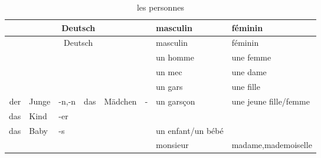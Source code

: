 \documentclass[12pt,A4paper,oneside,reqno]{amsart}
\numberwithin{equation}{section}
\theoremstyle{plain}
\theoremstyle{plain}
\theoremstyle{plain}
\numberwithin{equation}{section}
\theoremstyle{remark}
\begin{document}
	\begin{longtable}{rll|rll|l|l}
	\hline
\multicolumn{6}{c|}{Deutsch}&	masculin	&	f\'{e}minin	\\
	\hline
	\endhead
	\hline
\multicolumn{6}{c|}{Deutsch}&	masculin	&	f\'{e}minin	\\
	\hline
	\endfirsthead	
	\hline
	\endfoot
	\hline		
	\caption{les personnes}
	\endlastfoot				
		
	&		&		&		&		&		&	un homme	&	une femme	\\
\hline															
&		&		&		&		&		&	un mec	&	une dame	\\
&		&		&		&		&		&	un gars	&	une fille	\\
der	&	Junge	&	-n,-n	&	das	&	M\"{a}dchen	&	-	&	un gars\c{c}on	&	une jeune fille/femme	\\
das	&	Kind	&	-er	&		&		&		&		&		\\
das	&	Baby	&	-s	&		&		&		&	un enfant/un b\'{e}b\'{e}	&		\\
\hline															
&		&		&		&		&		&	monsieur	&	madame,mademoiselle	\\


	
	
	
	
	
	
\end{longtable}
\end{document}
